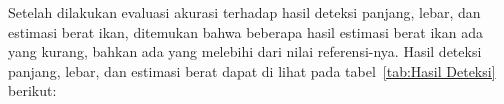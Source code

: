 Setelah dilakukan evaluasi akurasi terhadap hasil deteksi panjang, lebar, dan estimasi berat ikan, ditemukan bahwa beberapa hasil estimasi berat ikan ada yang kurang, bahkan ada yang melebihi dari nilai referensi-nya. Hasil deteksi panjang, lebar, dan estimasi berat dapat di lihat pada tabel~\ref{tab:Hasil Deteksi} berikut: %



